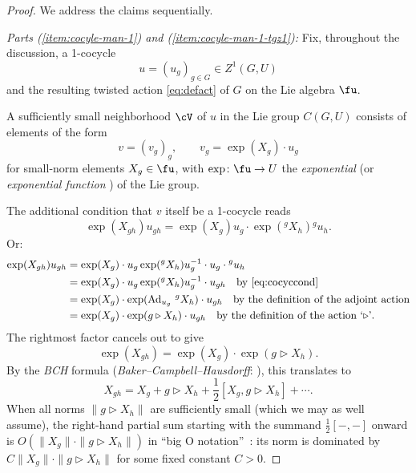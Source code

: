 \begin{proof}
 We address the claims sequentially.

 \emph{Parts {\rm (\ref{item:cocyle-man-1})} and {\rm(\ref{item:cocyle-man-1-tgz1})}:} Fix, throughout the discussion, a 1-cocycle
 \begin{equation*}
 u=(u_g)_{g\in G}\in Z^1(G,U)
 \end{equation*}
 and the resulting twisted action \eqref{eq:defact} of $G$ on the Lie algebra $\fu$.

 A sufficiently small neighborhood $\cV$ of $u$ in the Lie group $C(G,U)$ consists of elements of the form
 \begin{equation*}
 v=(v_g)_g,\qquad v_g = \exp(X_g)\cdot u_g
 \end{equation*}
 for small-norm elements $X_g\in \fu$, with $\exp\colon\fu\to U$ the {\it exponential} (or {\it exponential function} \cite[discussion following Definition IV.1]{neeb-inf} ) of the Lie group.


 The additional condition that $v$ itself be a 1-cocycle reads
 \begin{equation*}
 \exp(X_{gh})u_{gh} = \exp(X_g)u_g \cdot \exp\left({}^gX_h\right){}^gu_h.
 \end{equation*}
 Or:
 \begin{align*}
 \exp(X_{gh})u_{gh} &= \exp(X_g)\cdot u_g\exp({}^gX_h)u_g^{-1}\cdot u_g\cdot{}^gu_h\\
 &= \exp(X_g)\cdot u_g\exp({}^gX_h)u_g^{-1}\cdot u_{gh}
 \quad\text{by \eqref{eq:cocyccond}}\\
 &=\exp(X_g)\cdot \exp(\operatorname{Ad}_{u_g}\,{}^gX_h)\cdot u_{gh}
 \quad\text{by the definition of the adjoint action}\\
 &=\exp(X_g)\cdot \exp(g\triangleright X_h)\cdot u_{gh}
 \quad\text{by the definition of the action `$\triangleright$'}.
 \end{align*}
 The rightmost factor cancels out to give
 \begin{equation*}
 \exp(X_{gh}) = \exp(X_g)\cdot \exp(g\triangleright X_h).
 \end{equation*}
 By the {\it BCH} formula ({\it Baker--Campbell--Hausdorff}: \cite[Definition IV.1.3 and Corollary IV.1.10]{neeb-lc}), this translates to
 \begin{equation*}
 X_{gh} = X_g + g\triangleright X_h + \frac 12\left[X_g,g\triangleright X_h\right] + \cdots.
 \end{equation*}
 When all norms $\|g\triangleright X_h\|$ are sufficiently small (which we may as well assume), the right-hand partial sum starting with the summand $\frac 12[-,-]$ onward is $O(\|X_g\|\cdot \|g\triangleright X_h\|)$ in ``big O notation''~\cite{bigo}: its norm is dominated by $C\|X_g\|\cdot \|g\triangleright X_h\|$ for some fixed constant $C>0$.


\end{proof}
